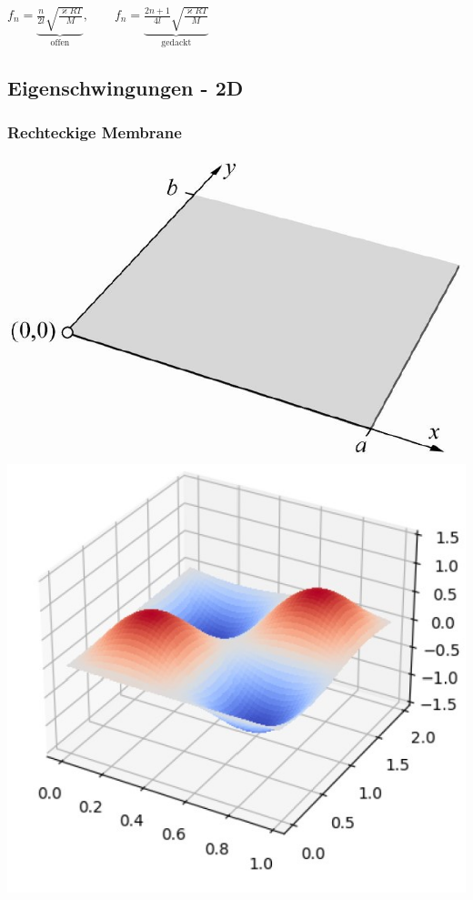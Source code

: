 \begin{center}
	$ \boxed{f_n = \underbrace{\frac{n}{2l}\sqrt{\frac{\varkappa R T}{M}}}_{\text{offen}}, \qquad f_n = \underbrace{\frac{2n+1}{4l}\sqrt{\frac{\varkappa R T}{M}}}_{\text{gedackt}}} $
\end{center}


\subsection{Eigenschwingungen - 2D}

\subsubsection{Rechteckige Membrane}


\begin{minipage}{0.3\linewidth}
	\includegraphics[width=0.98\linewidth]{Bilder/Wellen-Optik/membrane} \\
	\includegraphics[width=0.98\linewidth]{Bilder/Wellen-Optik/membrane-3d.jpg} \\
\end{minipage}
